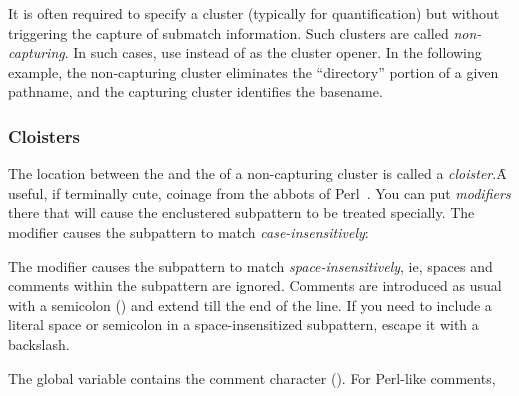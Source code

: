{It is often required to specify a cluster
(typically for quantification) but without triggering
the capture of submatch information.  Such
clusters are called {\em non-capturing}.  In such cases,
use  instead of \p{(} as the cluster opener.  In
the following example, the  non-capturing cluster 
eliminates the ``directory'' portion of a given
pathname, and the capturing cluster  identifies the
basename.


\subsubsection{Cloisters}

The location between the  and the \p{:} of a
non-capturing cluster is called a {\em cloister}.\f{A
useful, if terminally cute, coinage from the abbots of
Perl~.}  You can put {\em modifiers}
there that will cause the enclustered subpattern to be
treated specially.  The modifier  causes the
subpattern to match {\em case-insensitively}:


The modifier  causes the subpattern to match
{\em space-insensitively}, ie, spaces and
comments within the
subpattern are ignored.  Comments are introduced
as usual with a semicolon (\p{;}) and extend till
the end of the line.  If you need
to include a literal space or semicolon in
a space-insensitized subpattern, escape it
with a backslash.


\n The global variable 
contains the comment character (\q{#\;}).  
For Perl-like comments,  

}
